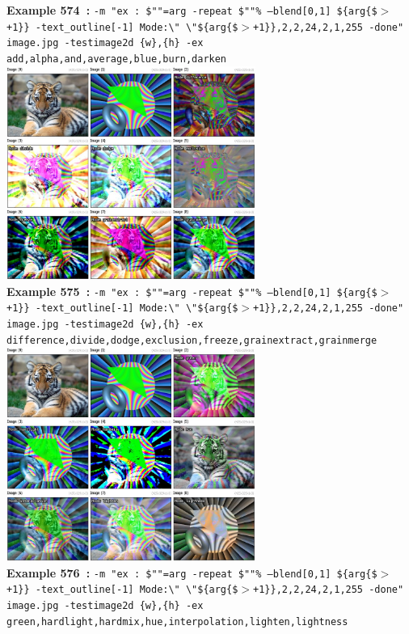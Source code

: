 \documentclass[a4paper,11pt,twoside]{book}
\begin{document}
\begin{center}
{\footnotesize \textbf{Example 574~:} \texttt{-m "ex : \$""=arg -repeat \$""\% --blend[0,1] \$\{arg\{\$$>$+1\}\} -text\_outline[-1] Mode:\textbackslash " \textbackslash "\$\{arg\{\$$>$+1\}\},2,2,24,2,1,255 -done" image.jpg -testimage2d \{w\},\{h\} -ex add,alpha,and,average,blue,burn,darken}}
\\\includegraphics[keepaspectratio=true,height=7cm,width=\textwidth]{img/gmic_def575.jpg}\\
{\footnotesize \textbf{Example 575~:} \texttt{-m "ex : \$""=arg -repeat \$""\% --blend[0,1] \$\{arg\{\$$>$+1\}\} -text\_outline[-1] Mode:\textbackslash " \textbackslash "\$\{arg\{\$$>$+1\}\},2,2,24,2,1,255 -done" image.jpg -testimage2d \{w\},\{h\} -ex difference,divide,dodge,exclusion,freeze,grainextract,grainmerge}}
\\\includegraphics[keepaspectratio=true,height=7cm,width=\textwidth]{img/gmic_def576.jpg}\\
{\footnotesize \textbf{Example 576~:} \texttt{-m "ex : \$""=arg -repeat \$""\% --blend[0,1] \$\{arg\{\$$>$+1\}\} -text\_outline[-1] Mode:\textbackslash " \textbackslash "\$\{arg\{\$$>$+1\}\},2,2,24,2,1,255 -done" image.jpg -testimage2d \{w\},\{h\} -ex green,hardlight,hardmix,hue,interpolation,lighten,lightness}}

\end{center}
\end{document}

